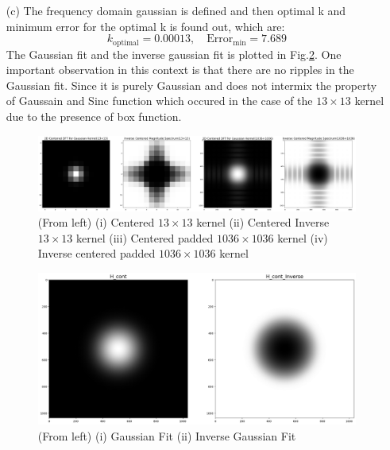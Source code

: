 \documentclass[12pt,a4paper,onecolumn]{exam}
\begin{document}
\begin{solution}
\begin{itemize}
      \item[(c)] The frequency domain gaussian is defined and then optimal k  and minimum error for the optimal k is found out, which are: $$k_{\text{optimal}} = 0.00013, \quad \text{Error}_{\text{min}} = 7.689$$ The Gaussian fit and the inverse gaussian fit is plotted in Fig.\ref{fig:2c}. One important observation in this context is that there are no ripples in the Gaussian fit. Since it is purely Gaussian and does not intermix the property of Gaussain and Sinc function which occured in the case of the $13 \times 13$ kernel due to the presence of box function. 
        \begin{figure}[H]
        \centering
        \includegraphics[scale = .18]{Output_Images/P02b.png}
        \caption{(From left) (i) Centered $13 \times 13$ kernel (ii) Centered Inverse $13 \times 13$ kernel (iii) Centered padded $1036 \times 1036$ kernel (iv) Inverse centered padded $1036 \times 1036$ kernel }
        \label{fig:2b}
        \end{figure}

        \begin{figure}[H]
        \centering
        \includegraphics[scale = .18]{Output_Images/P02c.png}
        \caption{(From left) (i) Gaussian Fit (ii) Inverse Gaussian Fit}
        \label{fig:2c}
        \end{figure}
    

\end{itemize}
\end{solution}
\end{document}
